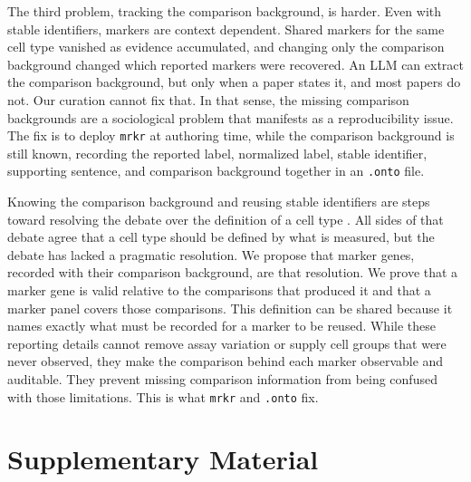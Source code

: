 \documentclass[10pt,twocolumn]{article}
\theoremstyle{plain}
\theoremstyle{definition}
\theoremstyle{remark}
\begin{document}
The third problem, tracking the comparison background, is harder. Even with stable identifiers, markers are context dependent. Shared markers for the same cell type vanished as evidence accumulated, and changing only the comparison background changed which reported markers were recovered. An LLM can extract the comparison background, but only when a paper states it, and most papers do not. Our curation cannot fix that. In that sense, the missing comparison backgrounds are a sociological problem that manifests as a reproducibility issue. The fix is to deploy \texttt{mrkr} at authoring time, while the comparison background is still known, recording the reported label, normalized label, stable identifier, supporting sentence, and comparison background together in an \texttt{.onto} file.

\balance

Knowing the comparison background and reusing stable identifiers are steps toward resolving the debate over the definition of a cell type \citep{Trapnell2015CellTypesStates,OsumiSutherland2021CellOntologies}. All sides of that debate agree that a cell type should be defined by what is measured, but the debate has lacked a pragmatic resolution. We propose that marker genes, recorded with their comparison background, are that resolution. We prove that a marker gene is valid relative to the comparisons that produced it and that a marker panel covers those comparisons. This definition can be shared because it names exactly what must be recorded for a marker to be reused. While these reporting details cannot remove assay variation or supply cell groups that were never observed, they make the comparison behind each marker observable and auditable. They prevent missing comparison information from being confused with those limitations. This is what \texttt{mrkr} and \texttt{.onto} fix.

\clearpage
\onecolumn
\appendix
\setcounter{figure}{0}
\setcounter{table}{0}
\renewcommand{\thefigure}{S\arabic{figure}}
\renewcommand{\thetable}{S\arabic{table}}

\section{Supplementary Material}
\end{document}
